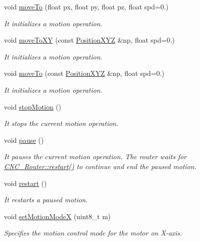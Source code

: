\begin{DoxyCompactItemize}
void \hyperlink{class_c_n_c___router_a1b652407bb9e7bb170d55d1c96e6611c}{move\+To} (float px, float py, float pz, float spd=0.)
\begin{DoxyCompactList}\small\item\em It initializes a motion operation. \end{DoxyCompactList}\item 
void \hyperlink{class_c_n_c___router_a3f6bcafb0e7ce2751a7e4a424a99ec7e}{move\+To\+X\+Y} (const \hyperlink{class_position_x_y_z}{Position\+X\+Y\+Z} \&np, float spd=0.)
\begin{DoxyCompactList}\small\item\em It initializes a motion operation. \end{DoxyCompactList}\item 
void \hyperlink{class_c_n_c___router_a7bb1accca615b13aadd050dfec1031e6}{move\+To} (const \hyperlink{class_position_x_y_z}{Position\+X\+Y\+Z} \&np, float spd=0.)
\begin{DoxyCompactList}\small\item\em It initializes a motion operation. \end{DoxyCompactList}\item 
void \hyperlink{class_c_n_c___router_aebacab02935c41a4c11b926c0770bcac}{stop\+Motion} ()
\begin{DoxyCompactList}\small\item\em It stops the current motion operation. \end{DoxyCompactList}\item 
void \hyperlink{class_c_n_c___router_a6b5ad1a227e63d3f374e0e53f3cf047c}{pause} ()
\begin{DoxyCompactList}\small\item\em It pauses the current motion operation. The router waits for \hyperlink{class_c_n_c___router_ab36f29523c76dd9f64c1ab5367c8f3d3}{C\+N\+C\+\_\+\+Router\+::restart()} to continue and end the paused motion. \end{DoxyCompactList}\item 
void \hyperlink{class_c_n_c___router_ab36f29523c76dd9f64c1ab5367c8f3d3}{restart} ()
\begin{DoxyCompactList}\small\item\em It restarts a paused motion. \end{DoxyCompactList}\item 
void \hyperlink{class_c_n_c___router_a6fd3b892aa1730dc2cb79bc91c0e90b6}{set\+Motion\+Mode\+X} (uint8\+\_\+t m)
\begin{DoxyCompactList}\small\item\em Specifies the motion control mode for the motor on X-\/axis. \end{DoxyCompactList}\item 

\end{DoxyCompactItemize}
